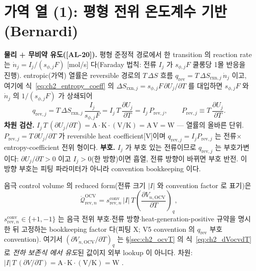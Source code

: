 \documentclass[11pt,a4paper]{article}
\newcommand{\OCV}{\mathrm{OCV}}
\newcommand{\rev}{\mathrm{rev}}
\newcommand{\rxn}{\mathrm{rxn}}
\newcommand{\conv}{\mathrm{conv}}
\newcommand{\AL}[1]{\textsf{[AL-#1]}}
\begin{document}
\section{가역 열 (1): 평형 전위 온도계수 기반 (Bernardi)}\label{sec:ch2_revOCV}
\textbf{물리 + 무비약 유도(\AL{20}).} 평형 준정적 경로에서 한 transition 의 reaction rate 는
$\dot n_j=I_j/(s_{\phi,j}F)$ [mol/s] 다(Faraday 법칙: 전류 $I_j$ 가 $s_{\phi,j}F$ 쿨롱당 1몰 반응을 진행).
entropic(가역) 열률은 reversible 경로의 $T\,\Delta S$ 흐름 $q_\rev=T\,\Delta S_{\rxn,j}\,\dot n_j$ 이고, 여기에
식~\eqref{eq:ch2_entropy_coeff} 의 $\Delta S_{\rxn,j}=s_{\phi,j}F\,\partial U_j/\partial T$ 를 대입하면
$s_{\phi,j}F$ 와 $\dot n_j$ 의 $1/(s_{\phi,j}F)$ 가 상쇄되어
\begin{equation}
\boxed{\;q_{\rev,j}=T\,\Delta S_{\rxn,j}\,\frac{I_j}{s_{\phi,j}F}=I_j\,T\,\frac{\partial U_j}{\partial T}
=I_j\,P_{\rev,j},\qquad P_{\rev,j}\equiv T\,\frac{\partial U_j}{\partial T}.\;}
\label{eq:ch2_qrev}
\end{equation}
\textbf{차원 검산.} $I_j\,T\,(\partial U_j/\partial T)=\mathrm A\cdot\mathrm K\cdot(\mathrm{V/K})=\mathrm{A\,V}=\mathrm W$
— 열률의 올바른 단위. $P_{\rev,j}=T\,\partial U_j/\partial T$ 가 reversible heat coefficient[V]이며 $q_{\rev,j}=I_jP_{\rev,j}$ 는
전류$\times$entropy-coefficient 전위 형이다. \textbf{부호.} $I_j$ 가 부호 있는 전류이므로 $q_{\rev,j}$ 는 부호가변이다:
$\partial U_j/\partial T>0$ 이고 $I_j>0$(한 방향)이면 흡열, 전류 방향이 바뀌면 부호 반전. 이 방향 부호는 피팅
파라미터가 아니라 convention bookkeeping 이다.

음극 control volume 의 reduced form(전류 크기 $|I|$ 와 convention factor 로 표기)은
\begin{equation}
\dot{\mathcal Q}_{\rev,n}^{\OCV}=s_{\rev,n}^{\conv}\,|I|\,T\left(\frac{\partial V_{n,\OCV}}{\partial T}\right)_q,
\label{eq:ch2_revOCV}
\end{equation}
$s_{\rev,n}^{\conv}\in\{+1,-1\}$ 는 음극 전위 부호$\cdot$전류 방향$\cdot$heat-generation-positive 규약을 명시한
뒤 고정하는 bookkeeping factor 다(피팅 X; V5 convention 의 $q_\rev$ 부호 convention). 여기서
$(\partial V_{n,\OCV}/\partial T)_q$ 는 \S\ref{sec:ch2_ocvT} 의 식~\eqref{eq:ch2_dVocvdT} 로 \emph{전하 보존식
에서 유도}된 값이지 외부 lookup 이 아니다. 차원: $|I|\,T\,(\partial V/\partial T)=\mathrm A\cdot\mathrm K\cdot
\mathrm{(V/K)}=\mathrm W$ \checkmark.
\end{document}
